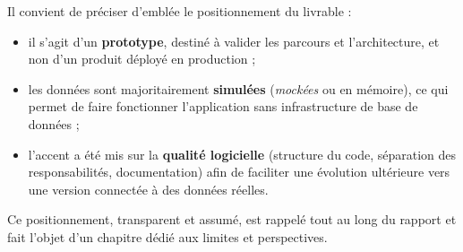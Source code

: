 Il convient de préciser d'emblée le positionnement du livrable :

\begin{itemize}
  \item il s'agit d'un \textbf{prototype}, destiné à valider les parcours et
        l'architecture, et non d'un produit déployé en production ;
  \item les données sont majoritairement \textbf{simulées} (\emph{mockées} ou
        en mémoire), ce qui permet de faire fonctionner l'application sans
        infrastructure de base de données ;
  \item l'accent a été mis sur la \textbf{qualité logicielle} (structure du
        code, séparation des responsabilités, documentation) afin de faciliter
        une évolution ultérieure vers une version connectée à des données
        réelles.
\end{itemize}

Ce positionnement, transparent et assumé, est rappelé tout au long du rapport
et fait l'objet d'un chapitre dédié aux limites et perspectives.
